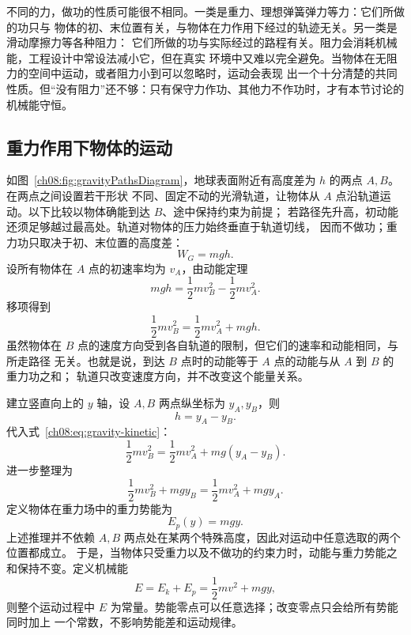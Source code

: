 不同的力，做功的性质可能很不相同。一类是重力、理想弹簧弹力等力：它们所做的功只与
物体的初、末位置有关，与物体在力作用下经过的轨迹无关。另一类是滑动摩擦力等各种阻力：
它们所做的功与实际经过的路程有关。阻力会消耗机械能，工程设计中常设法减小它，但在真实
环境中又难以完全避免。当物体在无阻力的空间中运动，或者阻力小到可以忽略时，运动会表现
出一个十分清楚的共同性质。但“没有阻力”还不够：只有保守力作功、其他力不作功时，才有本节讨论的机械能守恒。

\subsection{重力作用下物体的运动}

如图~\ref{ch08:fig:gravityPathsDiagram}，地球表面附近有高度差为 $h$ 的两点 $A,B$。在两点之间设置若干形状
不同、固定不动的光滑轨道，让物体从 $A$ 点沿轨道运动。以下比较以物体确能到达 $B$、途中保持约束为前提；
若路径先升高，初动能还须足够越过最高处。轨道对物体的压力始终垂直于轨道切线，
因而不做功；重力功只取决于初、末位置的高度差：
\gravityPathsDiagram
\begin{equation}
 W_G=mgh .
\end{equation}
设所有物体在 $A$ 点的初速率均为 $v_A$，由动能定理
\begin{equation}
 mgh=\frac12mv_B^2-\frac12mv_A^2.
\end{equation}
移项得到
\begin{equation}
 \frac12mv_B^2=\frac12mv_A^2+mgh.\label{ch08:eq:gravity-kinetic}
\end{equation}
虽然物体在 $B$ 点的速度方向受到各自轨道的限制，但它们的速率和动能相同，与所走路径
无关。也就是说，到达 $B$ 点时的动能等于 $A$ 点的动能与从 $A$ 到 $B$ 的重力功之和；
轨道只改变速度方向，并不改变这个能量关系。

建立竖直向上的 $y$ 轴，设 $A,B$ 两点纵坐标为 $y_A,y_B$，则
\begin{equation}
 h=y_A-y_B.
\end{equation}
代入式~\eqref{ch08:eq:gravity-kinetic}：
\begin{equation}
 \frac12mv_B^2=\frac12mv_A^2+mg(y_A-y_B).
\end{equation}
进一步整理为
\begin{equation}
 \frac12mv_B^2+mgy_B
 =\frac12mv_A^2+mgy_A.
\end{equation}
定义物体在重力场中的重力势能为
\begin{equation}
 E_p(y)=mgy.\label{ch08:eq:gravity-potential}
\end{equation}
上述推理并不依赖 $A,B$ 两点处在某两个特殊高度，因此对运动中任意选取的两个位置都成立。
于是，当物体只受重力以及不做功的约束力时，动能与重力势能之和保持不变。定义机械能
\begin{equation}
 E=E_k+E_p=\frac12mv^2+mgy,
\end{equation}
则整个运动过程中 $E$ 为常量。势能零点可以任意选择；改变零点只会给所有势能同时加上
一个常数，不影响势能差和运动规律。

